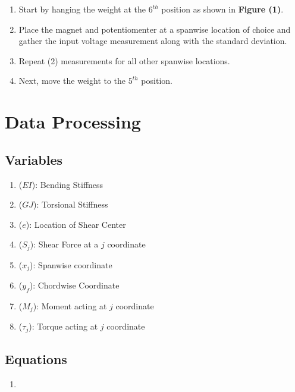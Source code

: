 \documentclass{article}
\begin{document}
  \begin{enumerate}
    \item Start by hanging the weight at the $6^{th}$ position as shown in \textbf{Figure (1)}. 
    \vspace{2.5mm}

    \item Place the magnet and potentiomenter at a spanwise location of choice and gather the input voltage measurement along with the standard deviation.
    \vspace{2.5mm}

    \item Repeat (2) measurements for all other spanwise locations.
    \vspace{2.5mm}

    \item Next, move the weight to the $5^{th}$ position.
    \vspace{2.5mm}
  \end{enumerate}

\section{Data Processing}
\subsection*{Variables}
\begin{enumerate}[label = \roman*.]
  \item (\(EI\)): Bending Stiffness
  \item (\(GJ\)): Torsional Stiffness
  \item (\(e\)): Location of Shear Center
  \item (\(S_{j}\)): Shear Force at a \(j\) coordinate
  \item (\(x_{j}\)): Spanwise coordinate
  \item (\(y_{f}\)): Chordwise Coordinate
  \item (\(M_{j}\)): Moment acting at \(j\) coordinate
  \item (\(\tau_{j}\)): Torque acting at \(j\) coordinate
\end{enumerate}

\subsection*{Equations}
\begin{enumerate}[label = \Roman*.]
    \item 
\end{enumerate} 
\end{document}
